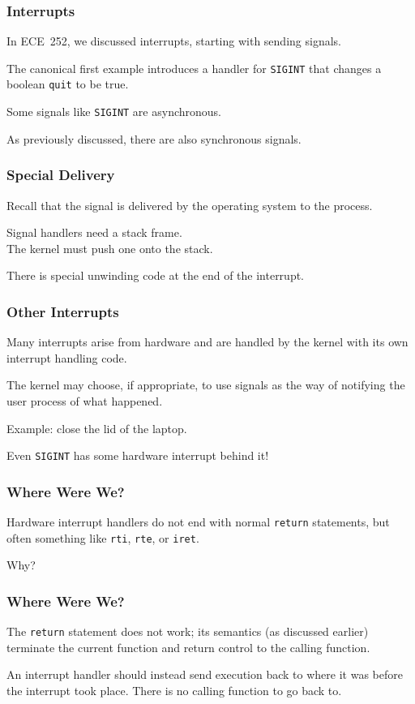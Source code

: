 \begin{frame}
\frametitle{Interrupts}

 In ECE~252, we discussed interrupts, starting with sending signals. 
 
 The canonical first example introduces a handler for \texttt{SIGINT} that changes a boolean \texttt{quit} to be true.
 
 
Some signals like \texttt{SIGINT} are \alert{asynchronous}.

As previously discussed, there are also synchronous signals. 

\end{frame}


\begin{frame}
\frametitle{Special Delivery}

Recall that the signal is delivered by the operating system to the process. 

Signal handlers need a stack frame.\\
\quad The kernel must push one onto the stack.

There is special unwinding code at the end of the interrupt.

\end{frame}


\begin{frame}
\frametitle{Other Interrupts}

Many interrupts arise from hardware and are handled by the kernel with its own interrupt handling code.

The kernel may choose, if appropriate, to use signals as the way of notifying the user process of what happened. 

Example: close the lid of the laptop.


Even \texttt{SIGINT} has some hardware interrupt behind it!

\end{frame}


\begin{frame}
\frametitle{Where Were We?}

Hardware interrupt handlers do not end with normal \texttt{return} statements, but often something like \texttt{rti}, \texttt{rte}, or \texttt{iret}. 

Why?

\end{frame}


\begin{frame}
\frametitle{Where Were We?}

 The \texttt{return} statement does not work; its semantics (as discussed earlier) terminate the current function and return control to the calling function. 
 
 An interrupt handler should instead send execution back to where it was before the interrupt took place. There is no calling function to go back to.  


\end{frame}


